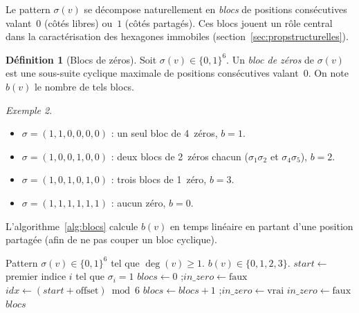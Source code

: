 \documentclass[12pt,a4paper]{article}
\theoremstyle{definition}
\newtheorem{definition}{D\'efinition}[section]
\theoremstyle{remark}
\newtheorem{exemple}[definition]{Exemple}
\newcommand{\degv}{\deg(v)}
\begin{document}
Le pattern $\sigma(v)$ se d\'ecompose naturellement en \emph{blocs} de
positions cons\'ecutives valant~$0$ (c\^ot\'es libres) ou~$1$ (c\^ot\'es
partag\'es). Ces blocs jouent un r\^ole central dans la caract\'erisation
des hexagones immobiles (section~\ref{sec:propstructurelles}).

\begin{definition}[Blocs de z\'eros]
\label{def:blocs}
Soit $\sigma(v) \in \{0,1\}^6$. Un \emph{bloc de z\'eros} de $\sigma(v)$
est une sous-suite cyclique maximale de positions cons\'ecutives
valant~$0$. On note $b(v)$ le nombre de tels blocs.
\end{definition}

\begin{exemple}
\begin{itemize}
  \item $\sigma = (1, 1, 0, 0, 0, 0)$ : un seul bloc de 4~z\'eros,
        $b = 1$.
  \item $\sigma = (1, 0, 0, 1, 0, 0)$ : deux blocs de 2~z\'eros chacun
        ($\sigma_1\sigma_2$ et $\sigma_4\sigma_5$), $b = 2$.
  \item $\sigma = (1, 0, 1, 0, 1, 0)$ : trois blocs de 1~z\'ero,
        $b = 3$.
  \item $\sigma = (1, 1, 1, 1, 1, 1)$ : aucun z\'ero, $b = 0$.
\end{itemize}
\end{exemple}

L'algorithme~\ref{alg:blocs} calcule $b(v)$ en temps lin\'eaire en partant
d'une position partag\'ee (afin de ne pas couper un bloc cyclique).

\begin{algorithm}[!ht]
\caption{Calcul du nombre de blocs de z\'eros $b(v)$.}
\label{alg:blocs}
\begin{algorithmic}[1]
\Require Pattern $\sigma(v) \in \{0,1\}^6$ tel que $\degv \geq 1$.
\Ensure $b(v) \in \{0, 1, 2, 3\}$.
\State $start \gets$ premier indice $i$ tel que $\sigma_i = 1$
\State $blocs \gets 0$ ;\quad $in\_zero \gets \mathrm{faux}$
  \State $idx \gets (start + \text{offset}) \bmod 6$
    \State $blocs \gets blocs + 1$ ;\quad $in\_zero \gets \mathrm{vrai}$
    \State $in\_zero \gets \mathrm{faux}$
  \EndIf
\EndFor
\State \Return $blocs$
\end{algorithmic}
\end{algorithm}

\end{document}
